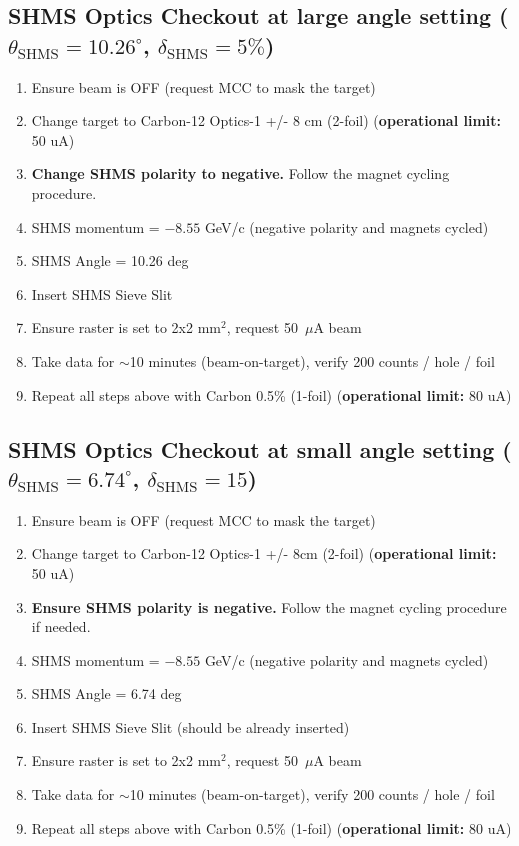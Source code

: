 \documentclass{article}
\begin{document}
\subsection*{SHMS Optics Checkout at large angle setting ($\theta_{\mathrm{SHMS}} =10.26^{\circ}$, $\delta_{\mathrm{SHMS}}=5\%$)}
\begin{enumerate}
    \item Ensure beam is OFF (request MCC to mask the target)
    \item Change target to Carbon-12 Optics-1 +/- 8 cm (2-foil) (\textbf{operational limit:} 50 uA) 
    \item \textbf{Change SHMS polarity to negative.} Follow the magnet cycling procedure. 
    \item SHMS momentum = $-8.55$ GeV/c (negative polarity and magnets cycled) 
    \item SHMS Angle = 10.26  deg
    \item Insert SHMS Sieve Slit
    \item Ensure raster is set to 2x2 mm$^{2}$, request 50~$\mu$A beam 
    \item Take data for $\sim$10 minutes (beam-on-target), verify 200 counts / hole / foil
    \item Repeat all steps above with Carbon 0.5\% (1-foil) (\textbf{operational limit:} 80 uA)
\end{enumerate}

    \subsection*{SHMS Optics Checkout at small angle setting ($\theta_{\mathrm{SHMS}} =6.74^{\circ}$, $\delta_{\mathrm{SHMS}}=15$)}
\begin{enumerate}
    \item Ensure beam is OFF (request MCC to mask the target)
    \item Change target to Carbon-12 Optics-1 +/- 8cm (2-foil) (\textbf{operational limit:} 50 uA) 
    \item \textbf{Ensure SHMS polarity is negative.} Follow the magnet cycling procedure if needed.
    \item SHMS momentum = $-8.55$ GeV/c (negative polarity and magnets cycled) 
    \item SHMS Angle = 6.74  deg 
    \item Insert SHMS Sieve Slit (should be already inserted)
    \item Ensure raster is set to 2x2 mm$^{2}$, request 50~$\mu$A beam
    \item Take data for $\sim$10 minutes (beam-on-target), verify 200 counts / hole / foil
    \item Repeat all steps above with Carbon 0.5\% (1-foil) (\textbf{operational limit:} 80 uA)
\end{enumerate}
\newpage
\end{document}

